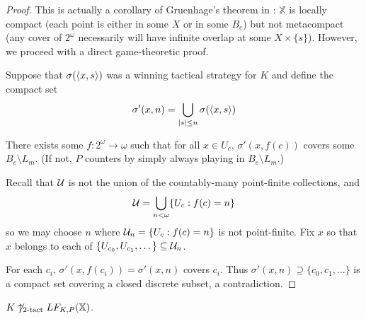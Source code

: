 \begin{proof}
This is actually a corollary of Gruenhage's theorem in \cite{G2}: $\mathbb{X}$ is locally compact (each point is either in some $X$ or in some $B_c$) but not metacompact (any cover of $2^\omega$ necessarily will have infinite overlap at some $X \times \{s\}$). However, we proceed with a direct game-theoretic proof.

Suppose that $\sigma(\langle x,s\rangle)$ was a winning tactical strategy for $K$ and define the compact set 
  \[
    \sigma'(x,n) = \bigcup_{|s|\leq n} \sigma(\langle x,s\rangle)
  \]

There exists some $f: 2^\omega \to \omega$ such that for all $x\in U_c$, $\sigma'(x,f(c))$ covers some $B_c \setminus L_m$. (If not, $P$ counters by simply always playing in $B_c \setminus L_m$.)

Recall that $\mathcal{U}$ is not the union of the countably-many point-finite collections, and 
  \[
    \mathcal{U} = \bigcup_{n<\omega} \{U_c : f(c) = n\}
  \]
so we may choose $n$ where $\mathcal{U}_n = \{U_c : f(c) = n\}$ is not point-finite. Fix $x$ so that $x$ belongs to each of $\{U_{c_0},U_{c_1},\dots\} \subseteq \mathcal{U}_n$.

For each $c_i$, $\sigma'(x,f(c_i))=\sigma'(x,n)$ covers $c_i$. Thus $\sigma'(x,n) \supseteq \{c_0,c_1,\dots\}$ is a compact set covering a closed discrete subset, a contradiction.
\end{proof}

\begin{theorem}
$K\not\uparrow_{2\text{-tact}}LF_{K,P}(\mathbb{X})$.
\end{theorem}

